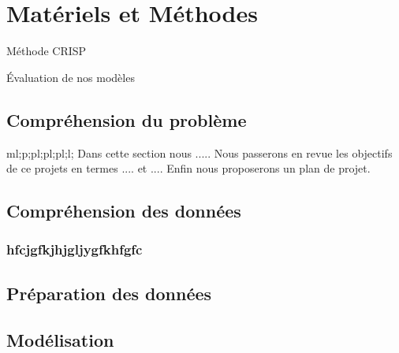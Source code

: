 \chapter{Matériels et Méthodes}

Méthode CRISP\cite{crisp}

Évaluation de nos modèles \cite{plasticc_team_2019_2539456}

\section{Compréhension du problème}
ml;p;pl;pl;pl;l;
Dans cette section nous .....
Nous passerons en revue les objectifs de ce projets en termes .... et ....
Enfin nous proposerons un plan de projet.


\section{Compréhension des données}
\subsection{hfcjgfkjhjgljygfkhfgfc}
\section{Préparation des données}\label{sec:data_preparation}

\section{Modélisation}

